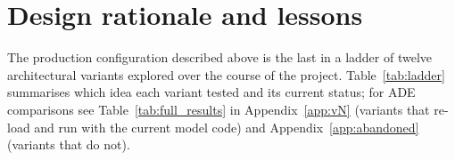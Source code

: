 \documentclass[oneside, a4paper, onecolumn, 11pt]{article}
\begin{document}
\section{Design rationale and lessons}\label{sec:lessons}

The production configuration described above is the last in a ladder
of twelve architectural variants explored over the course of the
project.  Table~\ref{tab:ladder} summarises which idea each variant
tested and its current status; for ADE comparisons see
Table~\ref{tab:full_results} in Appendix~\ref{app:vN} (variants that
re-load and run with the current model code) and
Appendix~\ref{app:abandoned} (variants that do not).
\end{document}
